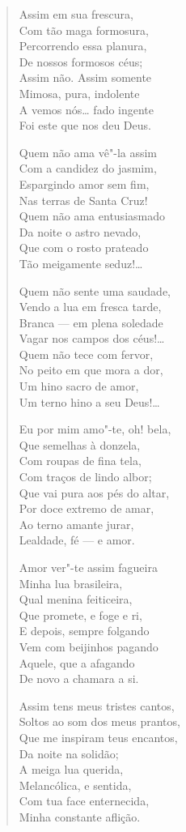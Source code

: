 \begin{verse}
Assim em sua frescura,\\
Com tão maga formosura,\\
Percorrendo essa planura,\\
De nossos formosos céus;\\
Assim não. Assim somente\\
Mimosa, pura, indolente\\
A vemos nós\ldots{} fado ingente\\
Foi este que nos deu Deus.

Quem não ama vê"-la assim\\
Com a candidez do jasmim,\\
Espargindo amor sem fim,\\
Nas terras de Santa Cruz!\\
Quem não ama entusiasmado\\
Da noite o astro nevado,\\
Que com o rosto prateado\\
Tão meigamente seduz!\ldots{}

Quem não sente uma saudade,\\
Vendo a lua em fresca tarde,\\
Branca --- em plena soledade\\
Vagar nos campos dos céus!\ldots{}\\
Quem não tece com fervor,\\
No peito em que mora a dor,\\
Um hino sacro de amor,\\
Um terno hino a seu Deus!\ldots{}

Eu por mim amo"-te, oh! bela,\\
Que semelhas à donzela,\\
Com roupas de fina tela,\\
Com traços de lindo albor;\\
Que vai pura aos pés do altar,\\
Por doce extremo de amar,\\
Ao terno amante jurar,\\
Lealdade, fé --- e amor.

\pagebreak

Amor ver"-te assim fagueira\\
Minha lua brasileira,\\
Qual menina feiticeira,\\
Que promete, e foge e ri,\\
E depois, sempre folgando\\
Vem com beijinhos pagando\\
Aquele, que a afagando\\
De novo a chamara a si.

Assim tens meus tristes cantos,\\
Soltos ao som dos meus prantos,\\
Que me inspiram teus encantos,\\
Da noite na solidão;\\
A meiga lua querida,\\
Melancólica, e sentida,\\
Com tua face enternecida,\\
Minha constante aflição.
\end{verse}

